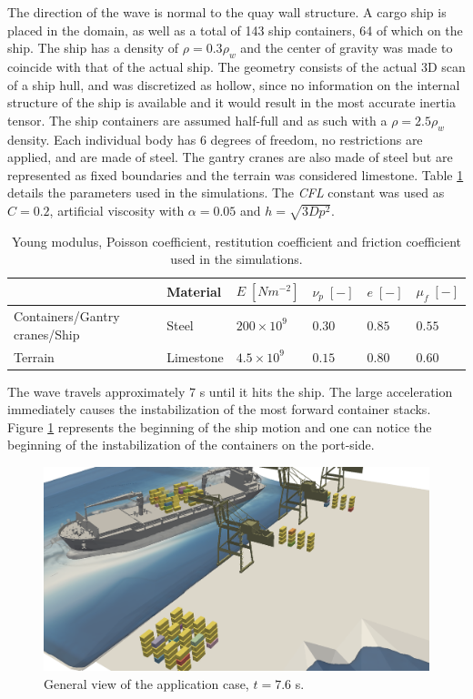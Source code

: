 The direction of the wave is normal to the quay wall structure. A cargo ship is placed in the domain, as well as a total of 143 ship containers, 64 of which on the ship. The ship has a density of $\rho=0.3\rho_{w}$ and the center of gravity was made to coincide with that of the actual ship. The geometry consists of the actual 3D scan of a ship hull, and was discretized as hollow, since no information on the internal structure of the ship is available and it would result in the most accurate inertia tensor. The ship containers are assumed half-full and as such with a $\rho=2.5\rho_{w}$ density. Each individual body has 6 degrees of freedom, no restrictions are applied, and are made of steel. The gantry cranes are also made of steel but are represented as fixed boundaries and the terrain was considered limestone. Table \ref{tab:material_props_sines} details the parameters used in the simulations. The \emph{CFL} constant was used as $C=0.2$, artificial viscosity with $\alpha=0.05$ and $h=\sqrt{3Dp^2}$.

%
\begin{table}[h]
\centering
\begin{tabular}{l|l|llll}
 & Material & $E\;[Nm^{-2}]$ & $\nu_p\;[-]$  & $e\;[-]$ & $\mu_f\;[-]$\\ \hline
Containers/Gantry cranes/Ship & Steel & $200\times10^9$ & $0.30$ & $0.85$ & $0.55$ \\
Terrain & Limestone & $4.5\times10^9$ & $0.15$ & $0.80$ & $0.60$
\end{tabular}
\caption{Young modulus, Poisson coefficient, restitution coefficient and friction coefficient used in the simulations.}
\label{tab:material_props_sines}
\end{table}
%

The wave travels approximately $7$ s until it hits the ship. The large acceleration immediately causes the instabilization of the most forward container stacks. Figure \ref{fig:sines_t38} represents the beginning of the ship motion and one can notice the beginning of the instabilization of the containers on the port-side.
\begin{figure}[H]
	\centering
	\includegraphics[width=0.95\linewidth]{Figures/6.Chapter/sines_t38_II} 
	\caption{General view of the application case, $t=7.6$ s.}
	\label{fig:sines_t38} 
\end{figure}
%

